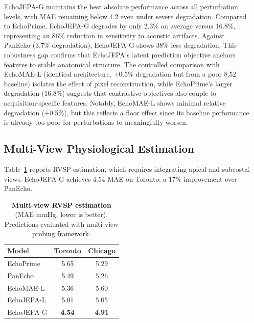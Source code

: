 \documentclass{article}
\theoremstyle{plain}
\theoremstyle{definition}
\theoremstyle{remark}
\begin{document}
EchoJEPA-G maintains the best absolute performance across all perturbation levels, with MAE remaining below 4.2 even under severe degradation.
Compared to EchoPrime, EchoJEPA-G degrades by only 2.3\% on average versus 16.8\%, representing an 86\% reduction in sensitivity to acoustic artifacts.
Against PanEcho (3.7\% degradation), EchoJEPA-G shows 38\% less degradation.
This robustness gap confirms that EchoJEPA's latent prediction objective anchors features to stable anatomical structure. The controlled comparison with EchoMAE-L (identical architecture, +0.5\% degradation but from a poor 8.52 baseline) isolates the effect of pixel reconstruction, while EchoPrime's larger degradation (16.8\%) suggests that contrastive objectives also couple to acquisition-specific features.
Notably, EchoMAE-L shows minimal relative degradation (+0.5\%), but this reflects a floor effect since its baseline performance is already too poor for perturbations to meaningfully worsen.

\subsection{Multi-View Physiological Estimation}
\label{sec:exp:multiview}

Table~\ref{tab:rvsp} reports RVSP estimation, which requires integrating apical and subcostal views. EchoJEPA-G achieves 4.54 MAE on Toronto, a 17\% improvement over PanEcho.


\begin{table}[t]
    \centering
\caption{\textbf{Multi-view RVSP estimation} (MAE mmHg, lower is better). 
Predictions evaluated with multi-view probing framework.}
    \label{tab:rvsp}
    \vspace{0.5em}
    \small
    \begin{tabular}{@{}lcc@{}}
        \toprule
        \textbf{Model} & \textbf{Toronto} & \textbf{Chicago} \\
        \midrule
        EchoPrime & 5.65 & 5.29 \\
        PanEcho & 5.49 & 5.26 \\
        \midrule
        EchoMAE-L & 5.36 & 5.60 \\
        EchoJEPA-L & 5.01 & 5.05 \\
        EchoJEPA-G & \textbf{4.54} & \textbf{4.91} \\
        \bottomrule
    \end{tabular}
\end{table}
\end{document}
